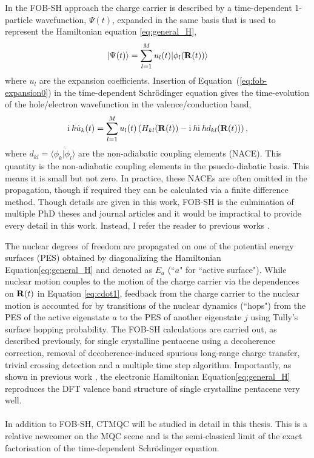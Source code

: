 \\\\
In the FOB-SH approach the charge carrier is described by a time-dependent 1-particle wavefunction, $\Psi(t)$,
expanded in the same basis that is used to represent the Hamiltonian equation \eqref{eq:general_H},
\begin{equation}
	|\Psi(t)\rangle  = \sum\limits_{l=1}^{M} u_l (t) |\phi_{l} ({\bf R}(t))\rangle \label{eq:fob-expansion0}
\end{equation}
where $u_l$ are the expansion coefficients. Insertion of Equation~(\ref{eq:fob-expansion0}) in the
time-dependent Schr\"{o}dinger equation gives the time-evolution of the hole/electron wavefunction in the
valence/conduction band,
\begin{equation}
	\mathrm{i} \: \hbar\dot{u}_{k}(t) = \sum\limits_{l=1}^{M}{u}_{l}(t)\left({H}_{kl}({\bf R}(t)) - \mathrm{i} \: \hbar \mathrm{i} \: \hbar d_{kl}({\bf R}(t)) \right) \label{eq:cdot1},
\end{equation}
where $d_{kl} \!=\! \langle \phi_k \vert \dot{\phi}_l \rangle$ are the non-adiabatic coupling elements (NACE). This quantity is the non-adiabatic coupling elements in the psuedo-diabatic basis. This means it is small but not zero. In practice, these NACEs are often omitted in the propagation, though if required they can be calculated via a finite difference method. Though details are given in this work, FOB-SH is the culmination of multiple PhD theses and journal articles and it would be impractical to provide every detail in this work. Instead, I refer the reader to previous works \cite{Carof2017FSSH_inline, FOB-SH_Spencer_inline}.

The nuclear degrees of freedom are propagated on one of the potential energy surfaces (PES) obtained by diagonalizing the
Hamiltonian Equation\eqref{eq:general_H} and denoted as $E_a$ (``$a$" for ``active surface"). While nuclear motion
couples to the motion of the charge carrier via the dependences on ${\bf R}(t)$ in Equation \eqref{eq:cdot1}, feedback
from the charge carrier to the nuclear motion is accounted for by transitions of the nuclear dynamics (``hops") from
the PES of the active eigenstate $a$ to the PES of another eigenstate $j$ using Tully's surface hopping probability.\cite{FSSH_orig}
The FOB-SH calculations are carried out, as described previously, for single crystalline pentacene\cite{Giannini2020} using a decoherence correction, removal of decoherence-induced spurious long-range charge transfer, trivial crossing detection
and a multiple time step algorithm. Importantly, as shown in previous work \cite{gajdos_ultrafast_2014}, the electronic Hamiltonian Equation\eqref{eq:general_H}
reproduces the DFT valence band structure of single crystalline pentacene\cite{Giannini2020} very well.
\\\\
In addition to FOB-SH, CTMQC will be studied in detail in this thesis. This is a relative newcomer on the MQC scene and is the semi-classical limit of the exact factorisation of the time-dependent Schr\"odinger equation.
